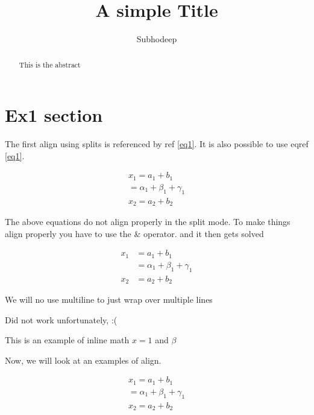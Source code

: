 \documentclass{article}[12pt]
\numberwithin{equation}{section}
\begin{document}
\title{A simple Title}
\author{Subhodeep}

\maketitle

\begin{abstract}
This is the abstract
\end{abstract}

\section{Ex1 section}

The first align using splits is referenced by ref \ref{eq1}. It is also possible to use eqref \eqref{eq1}. 

\begin{equation}
\label{eq1} 
\begin{split}
x_1 = a_1 + b_1\\
 = \alpha_1 + \beta_1 + \gamma_1\\
x_2 = a_2 + b_2
\end{split}
\end{equation}

The above equations do not align properly in the split mode. To make things align properly you have to use the \& operator. and it then gets solved

\begin{equation}
\begin{split}
x_1 & = a_1 + b_1\\
 & = \alpha_1 + \beta_1 + \gamma_1\\
x_2 & = a_2 + b_2
\end{split}
\end{equation}

We will no use multiline to just wrap over multiple lines


Did not work unfortunately, :(

This is an example of inline math $x=1$ and \(\beta\)


Now, we will look at an examples of align.

\begin{align}
x_1 = a_1 + b_1\\
 = \alpha_1 + \beta_1 + \gamma_1\\
x_2 = a_2 + b_2
\end{align}
\end{document}

